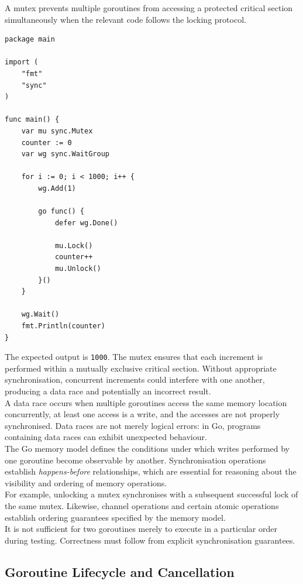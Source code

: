 A mutex prevents multiple goroutines from accessing a protected critical section simultaneously when the relevant code follows the locking protocol.

\begin{lstlisting}
package main

import (
    "fmt"
    "sync"
)

func main() {
    var mu sync.Mutex
    counter := 0
    var wg sync.WaitGroup

    for i := 0; i < 1000; i++ {
        wg.Add(1)

        go func() {
            defer wg.Done()

            mu.Lock()
            counter++
            mu.Unlock()
        }()
    }

    wg.Wait()
    fmt.Println(counter)
}
\end{lstlisting}

The expected output is \texttt{1000}. The mutex ensures that each increment is performed within a mutually exclusive critical section. Without appropriate synchronisation, concurrent increments could interfere with one another, producing a data race and potentially an incorrect result.\\

A data race occurs when multiple goroutines access the same memory location concurrently, at least one access is a write, and the accesses are not properly synchronised. Data races are not merely logical errors: in Go, programs containing data races can exhibit unexpected behaviour.\\

The Go memory model defines the conditions under which writes performed by one goroutine become observable by another. Synchronisation operations establish \textit{happens-before} relationships, which are essential for reasoning about the visibility and ordering of memory operations.\\

For example, unlocking a mutex synchronises with a subsequent successful lock of the same mutex. Likewise, channel operations and certain atomic operations establish ordering guarantees specified by the memory model.\\

It is not sufficient for two goroutines merely to execute in a particular order during testing. Correctness must follow from explicit synchronisation guarantees.

\subsection{Goroutine Lifecycle and Cancellation}

